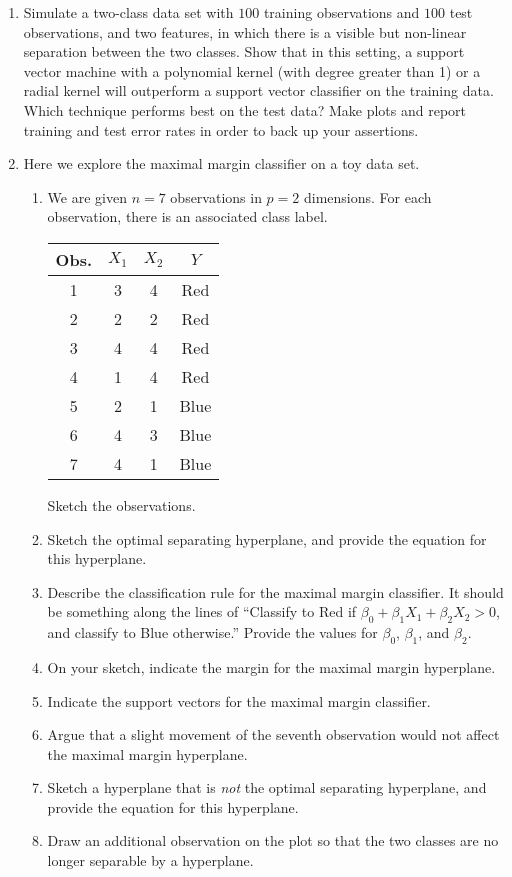 \documentclass[12pt]{article}
\begin{document}
\begin{enumerate}
\item Simulate a two-class data set with $100$ training observations and $100$ test observations, and two features, in which there is a visible but non-linear separation between the two classes. Show that in this setting, a support vector machine with a polynomial kernel (with degree greater than 1) or a radial kernel will outperform a support vector classifier on the training data. Which technique performs best on the test data? Make plots and report training and test error rates in order to back up your assertions.
 
 \item Here we explore the maximal margin classifier on a toy data set.
\begin{enumerate}
\item We are given $n=7$ observations in $p=2$ dimensions. For each observation, there is an associated class label.
\begin{center}
\begin{tabular}{c   c  c  c }
\hline
Obs. &  $X_1$ & $X_2$ & $Y$ \\
  \hline
1&  3& 4 & Red \\
 2& 2 & 2 & Red \\
3  & 4& 4 & Red \\
 4 &1 & 4 & Red \\
 5 &2&1&Blue\\
 6 &4&3&Blue\\
 7 &4 & 1 & Blue\\
 \hline
\end{tabular}
\end{center}
Sketch the observations.

\item Sketch the optimal separating hyperplane, and provide the equation for this hyperplane.
\item Describe the classification rule for the maximal margin classifier. It should be something along the lines of ``Classify to Red if $\beta_0+\beta_1 X_1 + \beta_2 X_2 > 0$, and classify to Blue otherwise.'' Provide the values for $\beta_0$, $\beta_1$, and $\beta_2$.
\item On your sketch, indicate the margin for the maximal margin hyperplane.
\item Indicate the support vectors for the maximal margin classifier.
\item Argue that a slight movement of the seventh observation would not affect the maximal margin hyperplane.
\item Sketch a hyperplane that is \emph{not} the optimal separating hyperplane, and provide the equation for this hyperplane.
\item Draw an additional observation on the plot so that the two classes are no longer separable by a hyperplane.
\end{enumerate}

 
\end{enumerate}
\end{document}
